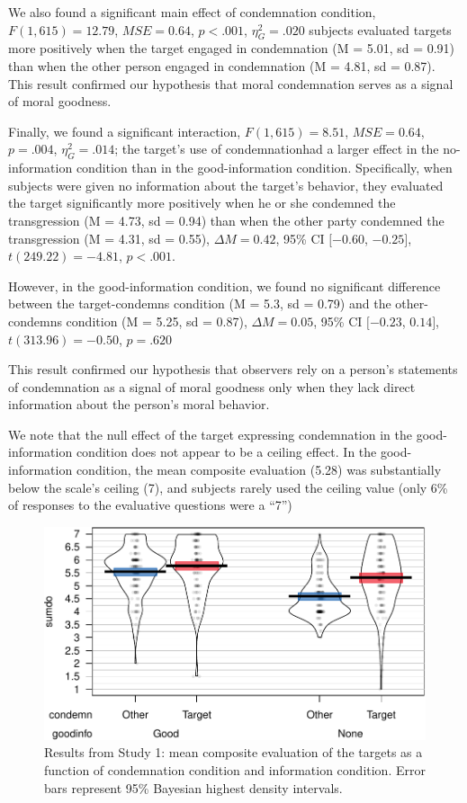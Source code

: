 \documentclass[english,man]{apa6}
\theoremstyle{definition}
\theoremstyle{definition}
\theoremstyle{remark}
\begin{document}
We also found a significant main effect of condemnation condition,
\(F(1, 615) = 12.79\), \(\mathit{MSE} = 0.64\), \(p < .001\),
\(\eta^2_G = .020\) subjects evaluated targets more positively when the
target engaged in condemnation (M = 5.01, sd = 0.91) than when the other
person engaged in condemnation (M = 4.81, sd = 0.87). This result
confirmed our hypothesis that moral condemnation serves as a signal of
moral goodness.

Finally, we found a significant interaction, \(F(1, 615) = 8.51\),
\(\mathit{MSE} = 0.64\), \(p = .004\), \(\eta^2_G = .014\); the target's
use of condemnationhad a larger effect in the no-information condition
than in the good-information condition. Specifically, when subjects were
given no information about the target's behavior, they evaluated the
target significantly more positively when he or she condemned the
transgression (M = 4.73, sd = 0.94) than when the other party condemned
the transgression (M = 4.31, sd = 0.55), \(\Delta M = 0.42\), 95\% CI
\([-0.60\), \(-0.25]\), \(t(249.22) = -4.81\), \(p < .001\).

However, in the good-information condition, we found no significant
difference between the target-condemns condition (M = 5.3, sd = 0.79)
and the other-condemns condition (M = 5.25, sd = 0.87),
\(\Delta M = 0.05\), 95\% CI \([-0.23\), \(0.14]\),
\(t(313.96) = -0.50\), \(p = .620\)

This result confirmed our hypothesis that observers rely on a person's
statements of condemnation as a signal of moral goodness only when they
lack direct information about the person's moral behavior.

We note that the null effect of the target expressing condemnation in
the good-information condition does not appear to be a ceiling effect.
In the good-information condition, the mean composite evaluation (5.28)
was substantially below the scale's ceiling (7), and subjects rarely
used the ceiling value (only 6\% of responses to the evaluative
questions were a \enquote{7})

\begin{figure}[htbp]
\centering
\includegraphics{jordan_apa_files/figure-latex/figure1-1.pdf}
\caption{\label{fig:figure1}Results from Study 1: mean composite evaluation
of the targets as a function of condemnation condition and information
condition. Error bars represent 95\% Bayesian highest density
intervals.}
\end{figure}
\end{document}

